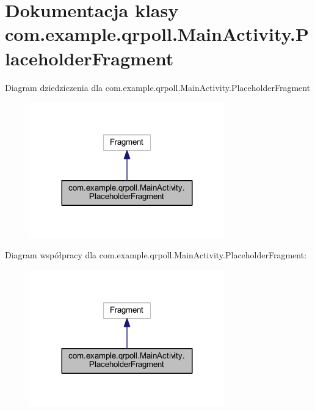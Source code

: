 \hypertarget{classcom_1_1example_1_1qrpoll_1_1_main_activity_1_1_placeholder_fragment}{\section{Dokumentacja klasy com.\+example.\+qrpoll.\+Main\+Activity.\+Placeholder\+Fragment}
\label{classcom_1_1example_1_1qrpoll_1_1_main_activity_1_1_placeholder_fragment}
}


Diagram dziedziczenia dla com.\+example.\+qrpoll.\+Main\+Activity.\+Placeholder\+Fragment
\nopagebreak
\begin{figure}[H]
\begin{center}
\leavevmode
\includegraphics[width=240pt]{classcom_1_1example_1_1qrpoll_1_1_main_activity_1_1_placeholder_fragment__inherit__graph}
\end{center}
\end{figure}


Diagram współpracy dla com.\+example.\+qrpoll.\+Main\+Activity.\+Placeholder\+Fragment\+:
\nopagebreak
\begin{figure}[H]
\begin{center}
\leavevmode
\includegraphics[width=240pt]{classcom_1_1example_1_1qrpoll_1_1_main_activity_1_1_placeholder_fragment__coll__graph}
\end{center}
\end{figure}
